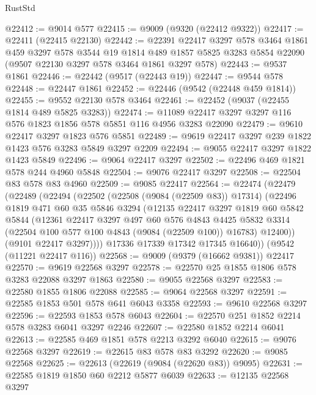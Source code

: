 \begin{lexlean}{RustStd}
\begin{coremodule}
@22412 := @9014 @577
@22415 := @9009 (@9320 (@22412 @9322))
@22417 := @22411 (@22415 @22130)
@22442 := @22391
    @22417
    @3297
    @578
    @3464
    @1861
    @459
    @3297
    @578
    @3544
    @19
    @1814
    @489
    @1857
    @5825
    @3283
    @5854
    @22090
    (@9507 @22130 @3297 @578 @3464 @1861 @3297 @578)
@22443 := @9537 @1861
@22446 := @22442 (@9517 (@22443 @19))
@22447 := @9544 @578
@22448 := @22447 @1861
@22452 := @22446 (@9542 (@22448 @459 @1814))
@22455 := @9552 @22130 @578 @3464
@22461 := @22452 (@9037 (@22455 @1814 @489 @5825 @3283))
@22474 := @11089 @22417 @3297 @3297 @116 @576 @1823 @1856 @578 @5851 @116 @4956 @3283 @22090
@22479 := @9610 @22417 @3297 @1823 @576 @5851
@22489 := @9619 @22417 @3297 @239 @1822 @1423 @576 @3283 @5849 @3297 @2209
@22494 := @9055 @22417 @3297 @1822 @1423 @5849
@22496 := @9064 @22417 @3297
@22502 := @22496 @469 @1821 @578 @244 @4960 @5848
@22504 := @9076 @22417 @3297
@22508 := @22504 @83 @578 @83 @4960
@22509 := @9085 @22417
@22564 := @22474
    (@22479
      (@22489
        (@22494
          (@22502
            (@22508 (@9084 (@22509 @83)) @17314)
            (@22496
              @1819
              @471
              @60
              @35
              @5846
              @3294
              (@12135
                @22417
                @3297
                @1819
                @60
                @5842
                @5844
                (@12361
                  @22417
                  @3297
                  @497
                  @60
                  @576
                  @4843
                  @4425
                  @5832
                  @3314
                  (@22504 @100 @577 @100 @4843 (@9084 (@22509 @100)) @16783)
                  @12400))
              (@9101 @22417 @3297))))
        @17336
        @17339
        @17342
        @17345
        @16640))
    (@9542 (@11221 @22417 @116))
@22568 := @9009 (@9379 (@16662 @9381)) @22417
@22570 := @9619 @22568 @3297
@22578 := @22570 @25 @1855 @1806 @578 @3283 @22088 @3297 @1863
@22580 := @9055 @22568 @3297
@22583 := @22580 @1855 @1806 @22088
@22585 := @9064 @22568 @3297
@22591 := @22585 @1853 @501 @578 @641 @6043 @3358
@22593 := @9610 @22568 @3297
@22596 := @22593 @1853 @578 @6043
@22604 := @22570 @251 @1852 @2214 @578 @3283 @6041 @3297 @2246
@22607 := @22580 @1852 @2214 @6041
@22613 := @22585 @469 @1851 @578 @2213 @3292 @6040
@22615 := @9076 @22568 @3297
@22619 := @22615 @83 @578 @83 @3292
@22620 := @9085 @22568
@22625 := @22613 (@22619 (@9084 (@22620 @83)) @9095)
@22631 := @22585 @1819 @1850 @60 @2212 @5877 @6039
@22633 := @12135 @22568 @3297

\end{coremodule}
\end{lexlean}
